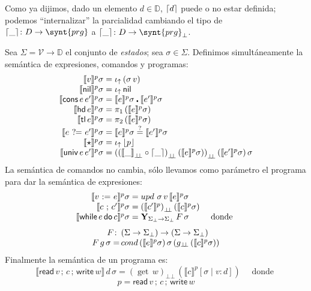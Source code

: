 \documentclass[a4paper,twoside,12pt]{article}
\newcommand{\trees}{\mathbb{D}}
\newcommand{\nil}{\mathsf{nil}}
\newcommand{\vars}{\mathcal{V}}
\newcommand{\hd}{\mathsf{hd}}
\newcommand{\tl}{\mathsf{tl}}
\newcommand{\conse}{\mathsf{cons}}
\newcommand{\isEq}{\mathop{?\!\!=}}
\newcommand{\assign}{\mathop{:=}}
\newcommand{\seq}{\mathop{;}}
\newcommand{\whilec}{\mathsf{while}}
\newcommand{\doc}{\mathsf{do}}
\newcommand{\readV}{\mathsf{read}}
\newcommand{\writeV}{\mathsf{write}}
\newcommand{\sem}[2]{\llbracket #1 \rrbracket #2}
\newcommand{\semR}[3]{\llbracket #2 \rrbracket^{#1} #3}
\newcommand{\semf}[1]{\llbracket #1 \rrbracket}
\newcommand{\liftFun}[1]{{#1}_{\bot\!\!\bot}}
\newcommand{\fixpoint}[2]{\mathbf{Y}_{#1}\,#2}
\begin{document}
Como ya dijimos, dado un elemento $d\in\trees$, $\lceil d \rceil$ puede o no
estar definida; podemos ``internalizar'' la parcialidad cambiando el
tipo de $\fromDF \colon D \to \synt{prg}$ a
$\fromDF \colon D \to \synt{prg}_\bot$. 

\begin{definition}[Semántica]
  Sea $\Sigma = \vars \to \trees$ el conjunto de \emph{estados}; sea
  $\sigma \in \Sigma$. Definimos simultáneamente  la semántica de
  expresiones, comandos y programas:
  \[
  \array{r@{\;=\;}l}%
  \semR{p}{v}{\sigma} & \inj{(\sigma\,v)} \\
  \semR{p}{\nil}{\sigma} & \inj{\nil} \\
  \semR{p}{\conse\,e\,e'}{\sigma} & \semR{p}{e}{\sigma}\centerdot \semR{p}{e'}{\sigma} \\
  \semR{p}{\hd\,e}{\sigma} & \pi_1\, (\semR{p}{e}{\sigma}) \\
  \semR{p}{\tl\,e}{\sigma} & \pi_2\, (\semR{p}{e}{\sigma}) \\
  \semR{p}{e\,\isEq\,e'}{\sigma} & \semR{p}{e}{\sigma} \overset{?}{=} \semR{p}{e'}{\sigma} \\
  \semR{p}{\star}{\sigma} & \inj{\toD{p}} \\
  \semR{p}{\univ\,e\,e'}{\sigma} & 
  \liftFun{(\liftFun{(\liftFun{\sem{\_}{ }} \circ \fromDF)}\, (\semR{p}{e}{\sigma}))}\, (\semR{p}{e'}{\sigma})\,\sigma \\  
  \endarray
  \]
  La semántica de comandos no cambia, sólo llevamos como parámetro
  el programa para dar la semántica de expresiones:
  \[
  \array{r@{\;=\;}l@{\quad}l}%
  \semR{p}{v\,\assign\,e}{\sigma} & \mathop{upd}\,\sigma\,v\,\semR{p}{e}{\sigma} \\
  \semR{p}{c\,\seq\, c'}{\sigma} & \liftFun{(\semR{p}{c'})}\,(\semR{p}{c}{\sigma})\\
  \semR{p}{\whilec\, e\, \doc\, c}{\sigma} & \fixpoint{\Sigma_\bot \to \Sigma_\bot}{F}\,\sigma & \text{ donde } \\
  \endarray
  \]
  \[
  \array{r@{\,}l}%
  F \colon & (\Sigma \to \Sigma_\bot) \to (\Sigma \to \Sigma_\bot) \\
  F\,g\,\sigma =& \mathop{cond}\, (\semR{p}{e}{\sigma})\, \sigma\, (\liftFun{g}\,(\semR p c \sigma))
  \endarray
  \]
  Finalmente la semántica de un programa es:
  \[\semf{\readV\,v\,\seq\,c\,\seq\,\writeV\,w}\,d\,\sigma = 
  \liftFun{(\mathop{get}\,w)}\,(\semR{p}{c}{[\sigma\mid v:d]}) \quad\text{ donde }\]
  \[ p = \readV\,v\,\seq\,c\,\seq\,\writeV\,w\]
  \end{definition}
\end{document}

